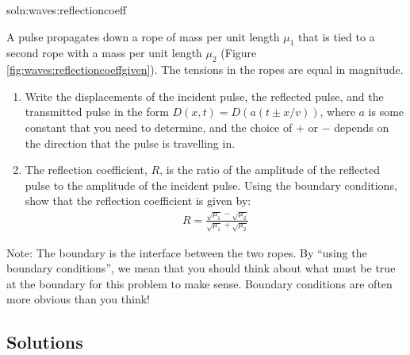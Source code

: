 \begin{problem}{soln:waves:reflectioncoeff}{\label{prob:waves:reflectioncoeff}A pulse propagates down a rope of mass per unit length $\mu_1$ that is tied to a second rope with a mass per unit length $\mu_2$ (Figure \ref{fig:waves:reflectioncoeffgiven}). The tensions in the ropes are equal in magnitude.
\begin{enumerate}[label=\alph*),topsep=-10pt]
\item Write the displacements of the incident pulse, the reflected pulse, and the transmitted pulse in the form $D(x,t)=D(a(t\pm x/v))$, where $a$ is some constant that you need to determine, and the choice of $+$ or $-$ depends on the direction that the pulse is travelling in.
\item The reflection coefficient, $R$, is the ratio of the amplitude of the reflected pulse to the amplitude of the incident pulse. Using the boundary conditions, show that the reflection coefficient is given by:
\begin{align*}
R=\frac{\sqrt{\mu_1}-\sqrt{\mu_2}}{\sqrt{\mu_1}+\sqrt{\mu_2}}
\end{align*}
\end{enumerate}
Note: The boundary is the interface between the two ropes. By ``using the boundary conditions'', we mean that you should think about what must be true at the boundary for this problem to make sense. Boundary conditions are often more obvious than you think!

}
\end{problem}

\newpage
\subsection{Solutions}

